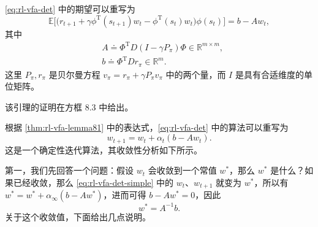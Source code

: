 \begin{theorem}[引理 8.1]
\label{thm:rl-vfa-lemma81}
\cref{eq:rl-vfa-det} 中的期望可以重写为
\begin{equation*}
\mathbb{E}\Big[\big(r_{t+1} + \gamma \phi^{\mathrm{T}}(s_{t+1}) w_{t} - \phi^{\mathrm{T}}(s_{t}) w_{t}\big) \phi(s_{t})\Big] = b - A w_{t},
\end{equation*}
其中
\begin{equation}
\begin{aligned}
& A \doteq \Phi^{\mathrm{T}} D (I - \gamma P_{\pi}) \Phi \in \mathbb{R}^{m \times m}, \\
& b \doteq \Phi^{\mathrm{T}} D r_{\pi} \in \mathbb{R}^{m}.
\end{aligned}
\label{eq:rl-vfa-Ab}
\end{equation}
这里 $P_{\pi}, r_{\pi}$ 是贝尔曼方程 $v_{\pi} = r_{\pi} + \gamma P_{\pi}v_{\pi}$ 中的两个量，而 $I$ 是具有合适维度的单位矩阵。
\end{theorem}

该引理的证明在方框 8.3 中给出。

根据 \cref{thm:rl-vfa-lemma81} 中的表达式，\cref{eq:rl-vfa-det} 中的算法可以重写为
\begin{equation}
w_{t+1} = w_{t} + \alpha_{t} (b - A w_{t}).
\label{eq:rl-vfa-det-simple}
\end{equation}
这是一个确定性迭代算法，其收敛性分析如下所示。

第一，我们先回答一个问题：假设 $w_{t}$ 会收敛到一个常值 $w^{*}$，那么 $w^{*}$ 是什么？如果已经收敛，那么 \cref{eq:rl-vfa-det-simple} 中的 $w_{t}$、$w_{t+1}$ 就变为 $w^{*}$，所以有 $w^{*} = w^{*} + \alpha_{\infty}(b - Aw^{*})$，进而可得 $b - Aw^{*} = 0$，因此
\begin{equation*}
w^{*} = A^{-1} b.
\end{equation*}
关于这个收敛值，下面给出几点说明。

